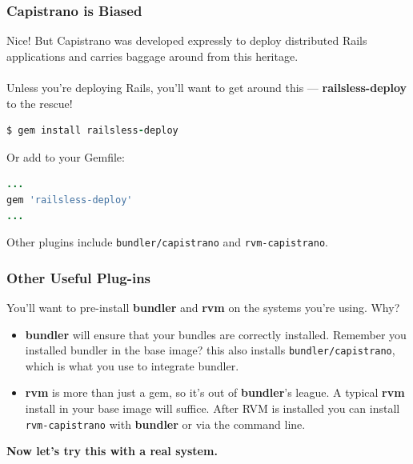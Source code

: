 \documentclass[t,handout]{beamer}
\begin{document}
\begin{frame}[fragile]
\frametitle{Capistrano is Biased}
Nice! But Capistrano was developed expressly to deploy distributed Rails applications and carries baggage around from this heritage.\\~\\

Unless you're deploying Rails, you'll want to get around this --- {\bf railsless-deploy} to the rescue!
\begin{lstlisting}[frame=none,language=Ruby,basicstyle=\scriptsize\ttfamily\color{black},commentstyle=\tiny\ttfamily\color{red}]
$ gem install railsless-deploy
\end{lstlisting}
Or add to your Gemfile:
\begin{lstlisting}[frame=none,language=Ruby,basicstyle=\scriptsize\ttfamily\color{black},commentstyle=\tiny\ttfamily\color{red}]
...
gem 'railsless-deploy'
...
\end{lstlisting}
Other plugins include {\small\tt bundler/capistrano} and {\small\tt rvm-capistrano}.
\end{frame}

\begin{frame}
\frametitle{Other Useful Plug-ins}
You'll want to pre-install {\bf bundler} and {\bf rvm} on the systems you're using. Why?
\begin{small}
\begin{itemize}
\item {\bf bundler} will ensure that your bundles are correctly installed.  Remember you installed bundler in the base image? this also installs {\small\tt bundler/capistrano}, which is what you use to integrate bundler.
\item {\bf rvm} is more than just a gem, so it's out of {\bf bundler}'s league.  A typical {\bf rvm} install in your base image will suffice.  After RVM is installed you can install {\small\tt rvm-capistrano} with {\bf bundler} or via the command line.
\end{itemize}
\end{small}
\begin{center}
{\bf Now let's try this with a real system.}
\end{center}
\end{frame}
\end{document}
